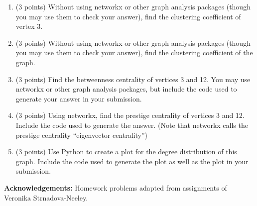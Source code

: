 \documentclass[11pt]{article}
\begin{document}
\begin{enumerate}
    \item (3 points) Without using networkx or other graph analysis packages
    (though you may use them to check your answer), find the clustering
    coefficient of vertex 3.

    \item (3 points) Without using networkx or other graph analysis packages
    (though you may use them to check your answer), find the clustering
    coefficient of the graph.

    \item (3 points) Find the betweenness centrality of vertices 3 and 12. You
    may use networkx or other graph analysis packages, but include the code used
    to generate your answer in your submission.

    \item (3 points) Using networkx, find the prestige centrality of vertices 3
    and 12. Include the code used to generate the answer. (Note that networkx
    calls the prestige centrality ``eigenvector centrality'')

    \item (3 points) Use Python to create a plot for the degree distribution of
    this graph.  Include the code used to generate the plot as well as the plot
    in your submission.

\end{enumerate}

{\bf Acknowledgements:} Homework problems adapted from assignments of
Veronika Strnadova-Neeley.
\end{document}
